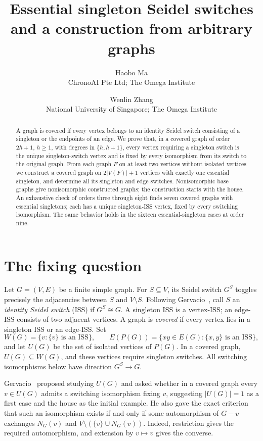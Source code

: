 \documentclass[11pt]{article}
\title{Essential singleton Seidel switches and a construction from arbitrary graphs}
\author{Haobo Ma\\{\small ChronoAI Pte Ltd; The Omega Institute}
\and Wenlin Zhang\\{\small National University of Singapore; The Omega Institute}}
\date{}
\begin{document}
\maketitle
\begin{abstract}
A graph is covered if every vertex belongs to an identity Seidel switch
consisting of a singleton or the endpoints of an edge. We prove that, in a
covered graph of order $2h+1$, $h\geq1$, with degrees in $\{h,h+1\}$, every vertex
requiring a singleton switch is the unique singleton-switch vertex and is
fixed by every isomorphism from its switch to the original graph. From each
graph $F$ on at least two vertices without isolated vertices we construct a covered graph on
$2|V(F)|+1$ vertices with exactly one essential singleton, and determine all
its singleton and edge switches. Nonisomorphic base graphs give
nonisomorphic constructed graphs; the construction starts with the house.
An exhaustive check of orders three through eight finds seven covered graphs
with essential singletons; each has a unique singleton-ISS vertex, fixed by
every switching isomorphism. The same behavior holds in the sixteen
essential-singleton cases at order nine.
\end{abstract}

\section{The fixing question}
Let $G=(V,E)$ be a finite simple graph. For $S\subseteq V$, its Seidel
switch $G^S$ toggles precisely the adjacencies between $S$ and $V\setminus S$.
Following Gervacio~\cite{gervacio}, call $S$ an \emph{identity Seidel switch}
(ISS) if $G^S\cong G$. A singleton ISS is a vertex-ISS; an edge-ISS consists
of two adjacent vertices. A graph is \emph{covered} if every vertex lies
in a singleton ISS or an edge-ISS. Set
\[
 W(G)=\{v:\{v\}\text{ is an ISS}\},\qquad
 E(P(G))=\{xy\in E(G):\{x,y\}\text{ is an ISS}\},
\]
and let $U(G)$ be the set of isolated vertices of $P(G)$. In a covered
graph, $U(G)\subseteq W(G)$, and these vertices require singleton switches.
All switching isomorphisms below have direction $G^S\longrightarrow G$.

Gervacio~\cite{communication} proposed studying $U(G)$ and asked whether
in a covered graph every $v\in U(G)$ admits a switching isomorphism
fixing $v$, suggesting
$|U(G)|=1$ as a first case and the house as the initial example. He also
gave the exact criterion that such an isomorphism exists if and only if
some automorphism of $G-v$ exchanges $N_G(v)$ and
$V\setminus(\{v\}\cup N_G(v))$. Indeed, restriction gives the required
automorphism, and extension by $v\mapsto v$ gives the converse.
\end{document}
